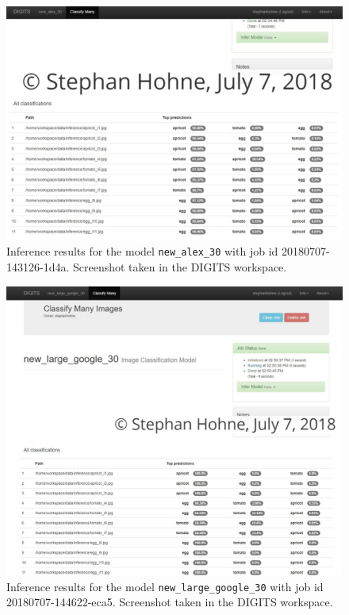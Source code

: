 \documentclass[10pt, journal, compsoc]{IEEEtran}
\begin{document}
\begin{figure}[thpb]
      \centering
      \includegraphics[width=\textwidth]{images/inference_results/20180707-143126-1d4a_inference.PNG}
       \caption{Inference results for the model \texttt{new\_alex\_30} with job id 20180707-143126-1d4a. Screenshot taken in the DIGITS workspace.}
      \label{fig:20180707-143126-1d4a_inference}
\end{figure}
\begin{figure}[thpb]
      \centering
      \includegraphics[width=\textwidth]{images/inference_results/20180707-144622-eca5_inference.PNG}
      \caption{Inference results for the model  \texttt{new\_large\_google\_30} with job id 20180707-144622-eca5. Screenshot taken in the DIGITS workspace.}
      \label{fig:20180707-144622-eca5_inference}
\end{figure}




\end{document}
